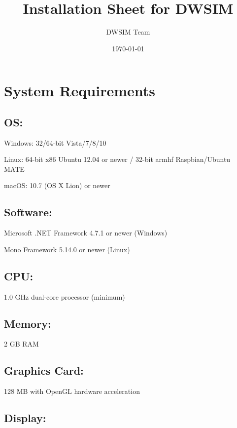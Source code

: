 \documentclass[12pt,a4paper]{article}
\begin{document}
\title{Installation Sheet for DWSIM}
\author{DWSIM Team}
\date{\today}

\maketitle

\section*{System Requirements}

\subsection*{OS:}

Windows: 32/64-bit Vista/7/8/10

\noindent Linux: 64-bit x86 Ubuntu 12.04 or newer / 32-bit armhf Raspbian/Ubuntu MATE

\noindent macOS: 10.7 (OS X Lion) or newer

\subsection*{Software:}

Microsoft .NET Framework 4.7.1 or newer (Windows) 

\noindent Mono Framework 5.14.0 or newer (Linux)

\subsection*{CPU:}
1.0 GHz dual-core processor (minimum)

\subsection*{Memory:}         

2 GB RAM

\subsection*{Graphics Card:}	

128 MB with OpenGL hardware acceleration

\subsection*{Display:}    
\end{document}
